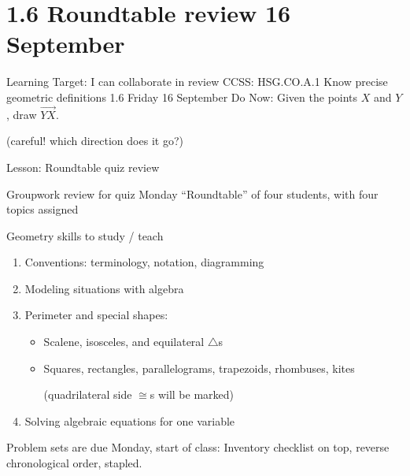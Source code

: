 \section{1.6 Roundtable review \hfill 16 September}
\begin{frame}{Learning Target: I can collaborate in review}
  {CCSS: HSG.CO.A.1 Know precise geometric definitions  \hfill \alert{1.6 Friday 16 September}}
  Do Now: Given the points $X$ and $Y$, draw $\overrightarrow{YX}$. \par \bigskip
  (careful! which direction does it go?) 
  \vspace{1cm}
  \begin{center}
  \end{center} \vspace{1cm}
  Lesson: Roundtable quiz review
\end{frame}

\begin{frame}{Groupwork review for \alert{quiz Monday}}
  {``Roundtable'' of four students, with four topics assigned}
  \begin{block}{Geometry skills to study / teach}
      \begin{enumerate}
    \item Conventions: terminology, notation, diagramming
    \item Modeling situations with algebra
    \item Perimeter and special shapes: 
    \begin{itemize}
      \item Scalene, isosceles, and equilateral $\triangle$s
      \item Squares, rectangles, parallelograms, trapezoids, rhombuses, kites \par 
      (quadrilateral side $\cong$s will be marked)
    \end{itemize}
    \item Solving algebraic equations for one variable
  \end{enumerate}
  \end{block}
  Problem sets are \alert{due Monday}, start of class: Inventory checklist on top, reverse chronological order, stapled. 
  \end{frame}

